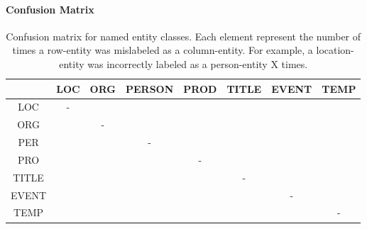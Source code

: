 \documentclass[11pt]{article}
\begin{document}
\paragraph{Confusion Matrix}


\begin{table}[t!]
\begin{center}
\begin{tabular}{cccccccc} 
& LOC & ORG & PERSON & PROD & TITLE & EVENT & TEMP \\
\hline
\noalign{\smallskip}
LOC  & - & & & & & &  \\
ORG  & & - & & & & &  \\
PER  & & & - & & & &  \\
PRO  & & & & - & & &  \\
TITLE  & & & & & - & &  \\
EVENT  & & & & & & - &  \\
TEMP  & & & & & & &  - \\
\end{tabular}
\end{center}
\caption{Confusion matrix for named entity classes. Each element represent the number of times a row-entity was mislabeled as a column-entity. For example, a location-entity was incorrectly labeled as a person-entity X times.}
\label{tab: confusion matrix}
\end{table}


\end{document}
